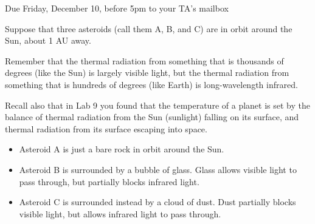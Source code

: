 \documentclass[12pt]{article}
\begin{document}
\Large
\centerline{}

\normalsize
\begin{center}
	Due Friday, December 10, before 5pm to your TA's mailbox
\end{center}

\bigskip

        Suppose that three asteroids (call them A, B, and C) are in orbit around the Sun, about 1 AU away. 

	\bigskip

	Remember that the thermal radiation from something that is thousands of degrees (like the Sun) is largely visible
	light, but the thermal radiation from something that is hundreds of degrees (like Earth) is long-wavelength infrared.
\bigskip

	Recall also that in Lab 9 you found that the temperature of a planet is set by the balance of thermal radiation from the Sun (sunlight) falling on its surface, and thermal radiation from its surface escaping into space.
\bigskip
\begin{itemize}

    \item	Asteroid A is just a bare rock in orbit around the Sun.

    \item Asteroid B is surrounded by a bubble of glass. Glass allows visible light to pass through, but partially blocks infrared light.

    \item	Asteroid C is surrounded instead by a cloud of dust. Dust partially blocks visible light, but allows infrared light to pass through.
\end{itemize}
\end{document}
